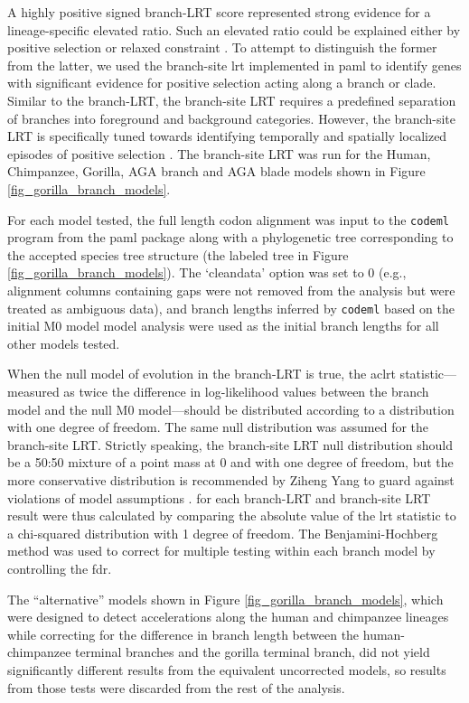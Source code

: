A highly positive signed branch-LRT score represented strong evidence
for a lineage-specific elevated \dnds ratio. Such an elevated ratio
could be explained either by positive selection or relaxed constraint
\citep{Nielsen2005,Sequencing2005a}. To attempt to distinguish the
former from the latter, we used the branch-site \ac{lrt} implemented
in \ac{paml} \citep{Zhang2005} to identify genes with significant
evidence for positive selection acting along a branch or
clade. Similar to the branch-LRT, the branch-site LRT requires a
predefined separation of branches into foreground and background
categories. However, the branch-site LRT is specifically tuned towards
identifying temporally and spatially localized episodes of positive
selection \citep{Nielsen1998,Yang2002b,Zhang2005}. The branch-site LRT
was run for the Human, Chimpanzee, Gorilla, AGA branch and AGA blade
models shown in Figure \ref{fig_gorilla_branch_models}.

For each model tested, the full length codon alignment was input to
the \texttt{codeml} program from the \ac{paml} package along with a
phylogenetic tree corresponding to the accepted species tree structure
(the labeled tree in Figure \ref{fig_gorilla_branch_models}). The
`cleandata’ option was set to 0 (e.g., alignment columns containing
gaps were not removed from the analysis but were treated as ambiguous
data), and branch lengths inferred by \texttt{codeml} based on the
initial M0 model model analysis were used as the initial branch
lengths for all other models tested.

When the null model of evolution in the branch-LRT is true, the
ac{lrt} statistic---measured as twice the difference in log-likelihood
values between the branch model and the null M0 model---should be
distributed according to a \chisq distribution with one degree of
freedom. The same null distribution was assumed for the branch-site
LRT. Strictly speaking, the branch-site LRT null distribution should
be a 50:50 mixture of a point mass at 0 and \chisq with one degree of
freedom, but the more conservative \chisq distribution is recommended
by Ziheng Yang to guard against violations of model assumptions
\citep{Yang2007}. \pvs for each branch-LRT and branch-site LRT result
were thus calculated by comparing the absolute value of the \ac{lrt}
statistic to a chi-squared distribution with 1 degree of freedom. The
Benjamini-Hochberg method \citep{Benjamini1995} was used to correct
for multiple testing within each branch model by controlling the
\ac{fdr}.

The ``alternative'' models shown in Figure
\ref{fig_gorilla_branch_models}, which were designed to detect
accelerations along the human and chimpanzee lineages while correcting
for the difference in branch length between the human-chimpanzee
terminal branches and the gorilla terminal branch, did not yield
significantly different results from the equivalent uncorrected
models, so results from those tests were discarded from the rest of
the analysis.

